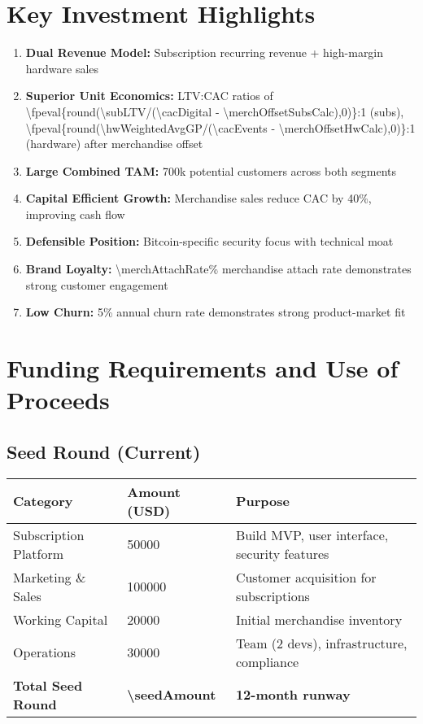 \documentclass[11pt]{article}
\newcommand{\numfpeval}[1]{\num{\fpeval{#1}}}
\begin{document}
\section{Key Investment Highlights}

\begin{enumerate}
  \item \textbf{Dual Revenue Model:} Subscription recurring revenue + high-margin hardware sales
  \item \textbf{Superior Unit Economics:} LTV:CAC ratios of \numfpeval{round(\subLTV/(\cacDigital - \merchOffsetSubsCalc),0)}:\num{1} (subs), \numfpeval{round(\hwWeightedAvgGP/(\cacEvents - \merchOffsetHwCalc),0)}:\num{1} (hardware) after merchandise offset
  \item \textbf{Large Combined TAM:} \num{700}k potential customers across both segments
  \item \textbf{Capital Efficient Growth:} Merchandise sales reduce CAC by \num{40}\%, improving cash flow
  \item \textbf{Defensible Position:} Bitcoin-specific security focus with technical moat
  \item \textbf{Brand Loyalty:} \num{\merchAttachRate}\% merchandise attach rate demonstrates strong customer engagement
  \item \textbf{Low Churn:} \num{5}\% annual churn rate demonstrates strong product-market fit
\end{enumerate}

\section{Funding Requirements and Use of Proceeds}

\subsection{Seed Round (Current)}
\begin{table}[H]
\centering
\begin{tabularx}{\linewidth}{l Y Y}
\toprule
Category & Amount (USD) & Purpose \\\midrule
Subscription Platform & \num{50000} & Build MVP, user interface, security features \\
Marketing \& Sales & \num{100000} & Customer acquisition for subscriptions \\
Working Capital & \num{20000} & Initial merchandise inventory \\
Operations & \num{30000} & Team (2 devs), infrastructure, compliance \\
\textbf{Total Seed Round} & \textbf{\num{\seedAmount}} & \textbf{12-month runway} \\
\bottomrule
\end{tabularx}
\end{table}
\end{document}
